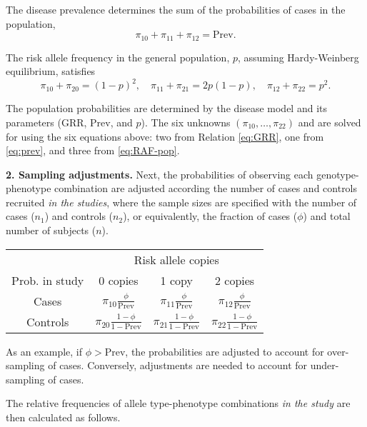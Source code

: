 The disease prevalence determines the sum of the probabilities of cases in the population,
\begin{equation} \label{eq:prev}
    \pi_{10} + \pi_{11} + \pi_{12} = \text{Prev}.
\end{equation}

The risk allele frequency in the general population, $p$, assuming Hardy-Weinberg equilibrium, satisfies 
\begin{equation} \label{eq:RAF-pop}
    \pi_{10} + \pi_{20} = (1-p)^2, \quad \pi_{11} + \pi_{21} = 2p(1-p), \quad \pi_{12} + \pi_{22} = p^2.
\end{equation}

The population probabilities are determined by the disease model and its parameters (GRR, Prev, and $p$).
The six unknowns  $(\pi_{10},\ldots,\pi_{22})$ and are solved for using the six equations above: two from Relation \eqref{eq:GRR}, one from \eqref{eq:prev}, and three from \eqref{eq:RAF-pop}.


\bigskip
{\bf 2. Sampling adjustments.}
Next, the probabilities of observing each genotype-phenotype combination are adjusted according the number of cases and controls recruited \emph{in the studies}, where the sample sizes are specified with the number of cases ($n_1$) and controls ($n_2$), or equivalently, the fraction of cases ($\phi$) and total number of subjects ($n$).

\begin{center}
    \begin{tabular}{cccc}
    \hline
    & \multicolumn{3}{c}{Risk allele copies} \\
    \cline{2-4}
    Prob. in study & 0 copies & 1 copy & 2 copies \\
    \hline
    Cases & $\pi_{10}\frac{\phi}{\text{Prev}}$ & $\pi_{11}\frac{\phi}{\text{Prev}}$ & $\pi_{12}\frac{\phi}{\text{Prev}}$ \\
    Controls & $\pi_{20}\frac{1-\phi}{1-\text{Prev}}$ & $\pi_{21}\frac{1-\phi}{1-\text{Prev}}$ & $\pi_{22}\frac{1-\phi}{1-\text{Prev}}$ \\
    \hline
    \end{tabular}
\end{center}

As an example, if $\phi > \text{Prev}$, the probabilities are adjusted to account for over-sampling of cases.
Conversely, adjustments are needed to account for under-sampling of cases.

The relative frequencies of allele type-phenotype combinations {\it in the study} are then calculated as follows.

